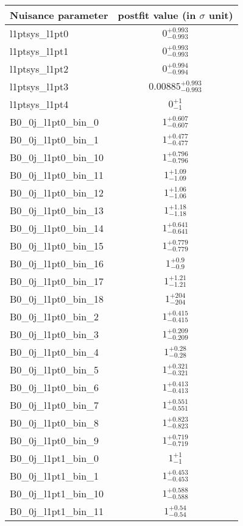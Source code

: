 
\begin{tabular}{|l|c|}
\hline
Nuisance parameter & postfit value (in $\sigma$ unit) \\\hline
l1ptsys\_l1pt0 & $0^{+0.993}_{-0.993}$ \\
l1ptsys\_l1pt1 & $0^{+0.993}_{-0.993}$ \\
l1ptsys\_l1pt2 & $0^{+0.994}_{-0.994}$ \\
l1ptsys\_l1pt3 & $0.00885^{+0.993}_{-0.993}$ \\
l1ptsys\_l1pt4 & $0^{+1}_{-1}$ \\
B0\_0j\_l1pt0\_bin\_0 & $1^{+0.607}_{-0.607}$ \\
B0\_0j\_l1pt0\_bin\_1 & $1^{+0.477}_{-0.477}$ \\
B0\_0j\_l1pt0\_bin\_10 & $1^{+0.796}_{-0.796}$ \\
B0\_0j\_l1pt0\_bin\_11 & $1^{+1.09}_{-1.09}$ \\
B0\_0j\_l1pt0\_bin\_12 & $1^{+1.06}_{-1.06}$ \\
B0\_0j\_l1pt0\_bin\_13 & $1^{+1.18}_{-1.18}$ \\
B0\_0j\_l1pt0\_bin\_14 & $1^{+0.641}_{-0.641}$ \\
B0\_0j\_l1pt0\_bin\_15 & $1^{+0.779}_{-0.779}$ \\
B0\_0j\_l1pt0\_bin\_16 & $1^{+0.9}_{-0.9}$ \\
B0\_0j\_l1pt0\_bin\_17 & $1^{+1.21}_{-1.21}$ \\
B0\_0j\_l1pt0\_bin\_18 & $1^{+204}_{-204}$ \\
B0\_0j\_l1pt0\_bin\_2 & $1^{+0.415}_{-0.415}$ \\
B0\_0j\_l1pt0\_bin\_3 & $1^{+0.209}_{-0.209}$ \\
B0\_0j\_l1pt0\_bin\_4 & $1^{+0.28}_{-0.28}$ \\
B0\_0j\_l1pt0\_bin\_5 & $1^{+0.321}_{-0.321}$ \\
B0\_0j\_l1pt0\_bin\_6 & $1^{+0.413}_{-0.413}$ \\
B0\_0j\_l1pt0\_bin\_7 & $1^{+0.551}_{-0.551}$ \\
B0\_0j\_l1pt0\_bin\_8 & $1^{+0.823}_{-0.823}$ \\
B0\_0j\_l1pt0\_bin\_9 & $1^{+0.719}_{-0.719}$ \\
B0\_0j\_l1pt1\_bin\_0 & $1^{+1}_{-1}$ \\
B0\_0j\_l1pt1\_bin\_1 & $1^{+0.453}_{-0.453}$ \\
B0\_0j\_l1pt1\_bin\_10 & $1^{+0.588}_{-0.588}$ \\
B0\_0j\_l1pt1\_bin\_11 & $1^{+0.54}_{-0.54}$ \\

\end{tabular}
